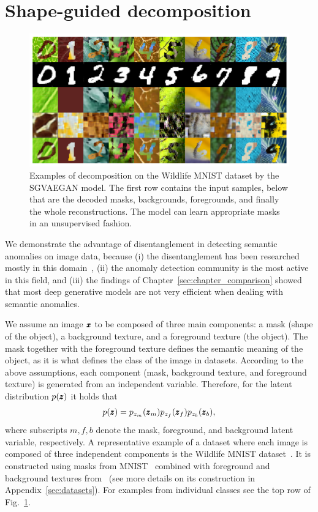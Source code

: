 \section{Shape-guided decomposition} \label{sec:model}
\begin{figure}[ht!]
    \centering
    \includegraphics[width=\textwidth]{data/chapter_sgvaegan/fig1_wmnist_grid.png}
    \caption{Examples of decomposition on the Wildlife MNIST dataset by the SGVAEGAN model. The first row contains the input samples, below that are the decoded masks, backgrounds, foregrounds, and finally the whole reconstructions. The model can learn appropriate masks in an unsupervised fashion.}
    \label{fig:wmnist_grid}
\end{figure}

We demonstrate the advantage of disentanglement in detecting semantic anomalies on image data, because (i) the disentanglement has been researched mostly in this domain~\cite{kim2018disentangling, kim2019bayes, choi2020discond}, (ii) the anomaly detection community is the most active in this field, and (iii) the findings of Chapter~\ref{sec:chapter_comparison} showed that most deep generative models are not very efficient when dealing with semantic anomalies.

We assume an image $\pmb{{x}}$ to be composed of three main components: a mask (shape of the object), a background texture, and a foreground texture (the object). The mask together with the foreground texture defines the semantic meaning of the object, as it is what defines the class of the image in datasets. According to the above assumptions, each component (mask, background texture, and foreground texture) is generated from an independent variable. Therefore, for the latent distribution $p(\pmb{{z}})$ it holds that
\begin{equation} \label{eq:latent_decomposition}
     p(\pmb{{z}}) = p_{z_{m}}(\pmb{{z}}_{m})p_{z_{f}}(\pmb{{z}}_{f})p_{z_b}(\pmb{{z}}_{b}),
\end{equation}
where subscripts $m,f,b$ denote the mask, foreground, and background latent variable, respectively. 
A representative example of a dataset where each image is composed of three independent components is the Wildlife MNIST dataset~\cite{sauer2021counterfactual}. It is constructed using masks from MNIST~\cite{lecun2010mnist} combined with foreground and background textures from~\cite{cimpoi2014describing} (see more details on its construction in Appendix~\ref{sec:datasets}). For examples from individual classes see the top row of Fig.~\ref{fig:wmnist_grid}. 

